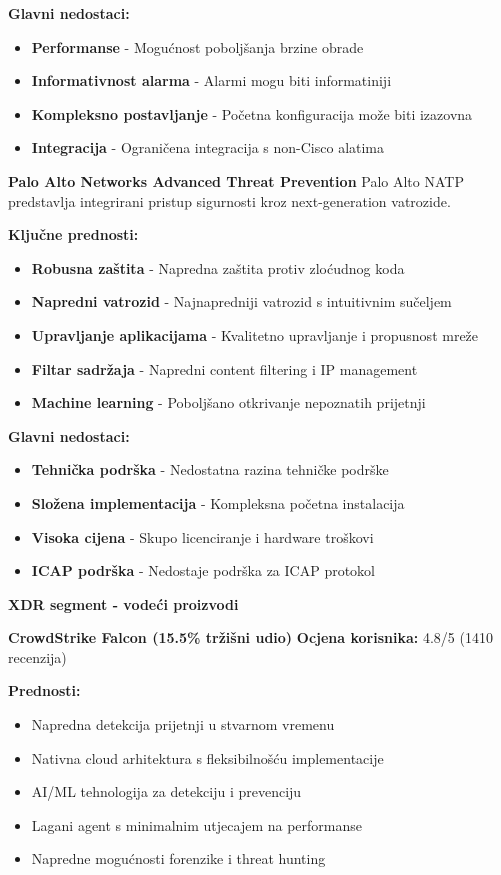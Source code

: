 \textbf{Glavni nedostaci:}
\begin{itemize}
\item \textbf{Performanse} - Mogućnost poboljšanja brzine obrade
\item \textbf{Informativnost alarma} - Alarmi mogu biti informatiniji
\item \textbf{Kompleksno postavljanje} - Početna konfiguracija može biti izazovna
\item \textbf{Integracija} - Ograničena integracija s non-Cisco alatima
\end{itemize}

\textbf{Palo Alto Networks Advanced Threat Prevention}
Palo Alto NATP predstavlja integrirani pristup sigurnosti kroz next-generation vatrozide.

\textbf{Ključne prednosti:}
\begin{itemize}
\item \textbf{Robusna zaštita} - Napredna zaštita protiv zloćudnog koda
\item \textbf{Napredni vatrozid} - Najnapredniji vatrozid s intuitivnim sučeljem
\item \textbf{Upravljanje aplikacijama} - Kvalitetno upravljanje i propusnost mreže
\item \textbf{Filtar sadržaja} - Napredni content filtering i IP management
\item \textbf{Machine learning} - Poboljšano otkrivanje nepoznatih prijetnji
\end{itemize}

\textbf{Glavni nedostaci:}
\begin{itemize}
\item \textbf{Tehnička podrška} - Nedostatna razina tehničke podrške
\item \textbf{Složena implementacija} - Kompleksna početna instalacija
\item \textbf{Visoka cijena} - Skupo licenciranje i hardware troškovi
\item \textbf{ICAP podrška} - Nedostaje podrška za ICAP protokol
\end{itemize}

\textbf{XDR segment - vodeći proizvodi}

\textbf{CrowdStrike Falcon (15.5\% tržišni udio)}
\textbf{Ocjena korisnika:} 4.8/5 (1410 recenzija)

\textbf{Prednosti:}
\begin{itemize}
\item Napredna detekcija prijetnji u stvarnom vremenu
\item Nativna cloud arhitektura s fleksibilnošću implementacije
\item AI/ML tehnologija za detekciju i prevenciju
\item Lagani agent s minimalnim utjecajem na performanse
\item Napredne mogućnosti forenzike i threat hunting
\end{itemize}

